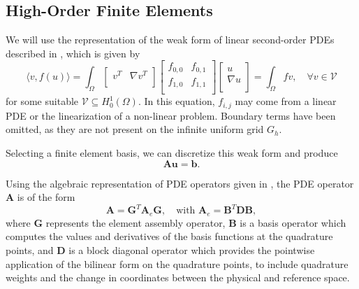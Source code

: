 \documentclass[review]{siamart190516}
\begin{document}
\subsection{High-Order Finite Elements}\label{sec:highorder}

We will use the representation of the weak form of linear second-order PDEs described in \cite{brown2010efficient}, which is given by
\begin{equation}
\langle v, f \left( u \right) \rangle = \int_{\Omega}
\begin{bmatrix}
  v^T & \nabla v^T    \\
\end{bmatrix}
\begin{bmatrix}
  f_{0, 0} & f_{0, 1} \\
  f_{1, 0} & f_{1, 1} \\
\end{bmatrix}
\begin{bmatrix}
  u                   \\
  \nabla u            \\
\end{bmatrix}
= \int_{\Omega} f v,\quad \forall v \in \mathcal V
\end{equation}
for some suitable $\mathcal V \subseteq H_0^1 \left( \Omega \right)$.
In this equation, $f_{i, j}$ may come from a linear PDE or the linearization of a non-linear problem.
Boundary terms have been omitted, as they are not present on the infinite uniform grid $G_h$.

Selecting a finite element basis, we can discretize this weak form and produce
\begin{equation}\label{pdediscrete}
\mathbf{A} \mathbf{u} = \mathbf{b}.
\end{equation}

Using the algebraic representation of PDE operators given in \cite{brown2010efficient}, the PDE operator $\mathbf{A}$ is of the form
\begin{equation}\label{efficienthighorder}
\mathbf{A} = \mathbf{G}^T \mathbf{A}_e \mathbf{G},\quad \text{with} \,\,\mathbf{A}_e = \mathbf{B}^T \mathbf{D} \mathbf{B},
\end{equation}
where $\mathbf{G}$ represents the element assembly operator, $\mathbf{B}$ is a basis operator which computes the values and derivatives of the basis functions at the quadrature points, and $\mathbf{D}$ is a block diagonal operator which provides the pointwise application of the bilinear form on the quadrature points, to include quadrature weights and the change in coordinates between the physical and reference space.
\end{document}
